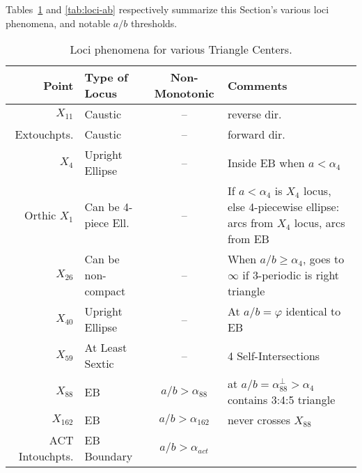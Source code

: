 Tables~\ref{tab:loci-phenomena} and \ref{tab:loci-ab} respectively summarize this Section's various loci phenomena, and notable $a/b$ thresholds.

\begin{table}
\begin{center}
\small
\begin{tabular}{|r|l|c|l|}
\hline
Point & Type of Locus & Non-Monotonic & Comments \\
\hline
$X_{11}$ & Caustic & -- & reverse dir. \\
Extouchpts. & Caustic & -- & forward dir. \\
$X_4$ & Upright Ellipse & -- & Inside EB when $a<\alpha_4$ \\
Orthic $X_1$ & Can be 4-piece Ell. & -- &
\makecell[tl]{If $a<\alpha_4$ is $X_4$ locus,\\else 4-piecewise ellipse:\\\;\;2 arcs from $X_4$ locus,\\\;\;2 arcs from EB} \\

$X_{26}$ & Can be non-compact & -- & \makecell[tl]{When $a/b{\geq}\alpha_4$, goes to $\infty$\\if 3-periodic is right triangle} \\
$X_{40}$ & Upright Ellipse & -- & At $a/b=\varphi$ identical to EB \\
$X_{59}$ & At Least Sextic & -- & 4 Self-Intersections \\
$X_{88}$ & EB & $a/b>\alpha_{88}$ & \makecell[tl]{at $a/b=\alpha_{88}^\perp>\alpha_4$\\contains 3:4:5 triangle}\\
$X_{162}$ & EB & $a/b>\alpha_{162}$ & never crosses $X_{88}$ \\
ACT Intouchpts. & EB Boundary & $a/b>\alpha_{act}$ & \\
\hline
\end{tabular}
\caption{Loci phenomena for various Triangle Centers.
\label{tab:loci-phenomena}}
\end{center}
\end{table}

